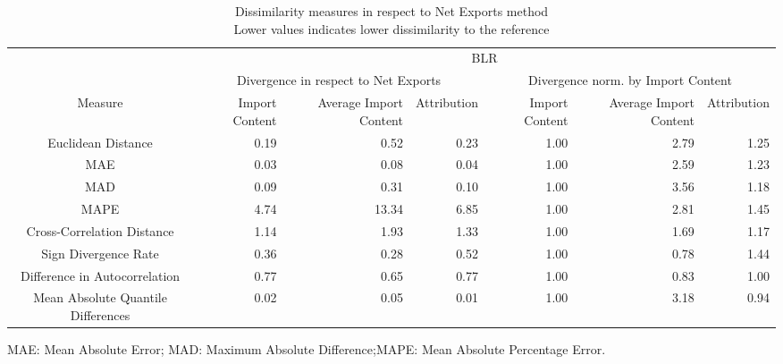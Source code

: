 \begin{table}[t]
\caption*{
{\large Dissimilarity measures in respect to Net Exports method} \\ 
{\small Lower values indicates lower dissimilarity to the reference}
} 
\fontsize{15.0pt}{18.0pt}\selectfont
\begin{tabular*}{\linewidth}{@{\extracolsep{\fill}}crrrrrr}
\toprule
 & \multicolumn{6}{c}{BLR} \\ 
\cmidrule(lr){2-7}
 & \multicolumn{3}{c}{Divergence in respect to Net Exports} & \multicolumn{3}{c}{Divergence norm. by Import Content} \\ 
\cmidrule(lr){2-4} \cmidrule(lr){5-7}
Measure & Import Content & Average Import Content & Attribution & Import Content & Average Import Content & Attribution \\ 
\midrule\addlinespace[2.5pt]
Euclidean Distance & 0.19 & 0.52 & 0.23 & 1.00 & 2.79 & 1.25 \\ 
MAE & 0.03 & 0.08 & 0.04 & 1.00 & 2.59 & 1.23 \\ 
MAD & 0.09 & 0.31 & 0.10 & 1.00 & 3.56 & 1.18 \\ 
MAPE & 4.74 & 13.34 & 6.85 & 1.00 & 2.81 & 1.45 \\ 
Cross-Correlation Distance & 1.14 & 1.93 & 1.33 & 1.00 & 1.69 & 1.17 \\ 
Sign Divergence Rate & 0.36 & 0.28 & 0.52 & 1.00 & 0.78 & 1.44 \\ 
Difference in Autocorrelation & 0.77 & 0.65 & 0.77 & 1.00 & 0.83 & 1.00 \\ 
Mean Absolute Quantile Differences & 0.02 & 0.05 & 0.01 & 1.00 & 3.18 & 0.94 \\ 
\bottomrule
\end{tabular*}
\begin{minipage}{\linewidth}
MAE: Mean Absolute Error; MAD: Maximum Absolute Difference;MAPE: Mean Absolute Percentage Error.\\
\end{minipage}
\end{table}


